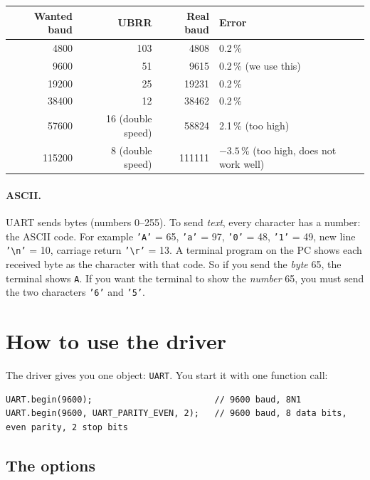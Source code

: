 \documentclass[11pt,a4paper]{article}
\newcommand{\code}[1]{\texttt{#1}}
\begin{document}
\begin{center}
\begin{tabular}{rrrl}
\toprule
\textbf{Wanted baud} & \textbf{UBRR} & \textbf{Real baud} & \textbf{Error} \\
\midrule
4800   & 103 & 4808   & 0.2\,\% \\
9600   & 51  & 9615   & 0.2\,\% \quad (we use this) \\
19200  & 25  & 19231  & 0.2\,\% \\
38400  & 12  & 38462  & 0.2\,\% \\
57600  & 16 (double speed) & 58824  & 2.1\,\% \quad (too high) \\
115200 & 8 (double speed)  & 111111 & $-3.5$\,\% \quad (too high, does not work well) \\
\bottomrule
\end{tabular}
\end{center}

\paragraph{ASCII.} UART sends bytes (numbers 0--255). To send \emph{text}, every
character has a number: the ASCII code. For example \code{'A'} = 65,
\code{'a'} = 97, \code{'0'} = 48, \code{'1'} = 49, new line \code{'\textbackslash n'} = 10,
carriage return \code{'\textbackslash r'} = 13. A terminal program on the PC shows
each received byte as the character with that code. So if you send the
\emph{byte} 65, the terminal shows \code{A}. If you want the terminal to show
the \emph{number} 65, you must send the two characters \code{'6'} and \code{'5'}.

\section{How to use the driver}

The driver gives you one object: \code{UART}. You start it with one function call:

\begin{lstlisting}
UART.begin(9600);                        // 9600 baud, 8N1
UART.begin(9600, UART_PARITY_EVEN, 2);   // 9600 baud, 8 data bits, even parity, 2 stop bits
\end{lstlisting}

\subsection*{The options}
\end{document}
